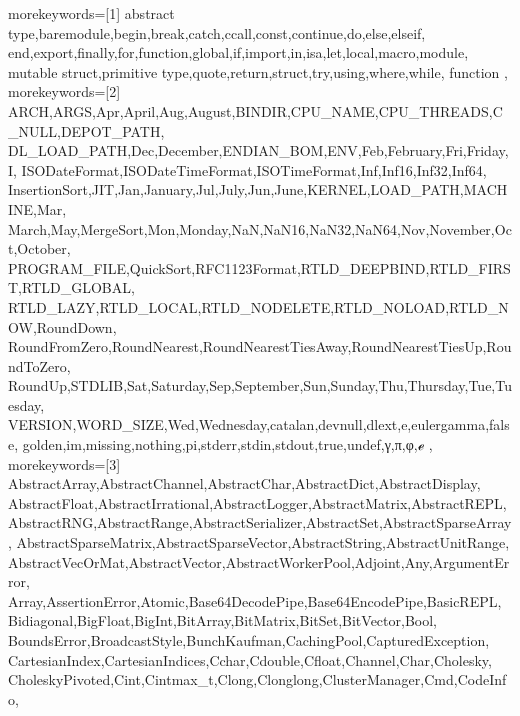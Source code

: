 \usepackage[linewidth=1pt]{mdframed}


\renewcommand{\arraystretch}{1.3}

\newcommand{\cmark}{\textcolor{green!80!black}{\ding{51}}}
\newcommand{\xmark}{\textcolor{red}{\ding{55}}}




{%
%
%
morekeywords=[1]
{%
abstract type,baremodule,begin,break,catch,ccall,const,continue,do,else,elseif,%
end,export,finally,for,function,global,if,import,in,isa,let,local,macro,module,%
mutable struct,primitive type,quote,return,struct,try,using,where,while, function%
},%
%
%
morekeywords=[2]
{%
ARCH,ARGS,Apr,April,Aug,August,BINDIR,CPU_NAME,CPU_THREADS,C_NULL,DEPOT_PATH,%
DL_LOAD_PATH,Dec,December,ENDIAN_BOM,ENV,Feb,February,Fri,Friday,I,%
ISODateFormat,ISODateTimeFormat,ISOTimeFormat,Inf,Inf16,Inf32,Inf64,%
InsertionSort,JIT,Jan,January,Jul,July,Jun,June,KERNEL,LOAD_PATH,MACHINE,Mar,%
March,May,MergeSort,Mon,Monday,NaN,NaN16,NaN32,NaN64,Nov,November,Oct,October,%
PROGRAM_FILE,QuickSort,RFC1123Format,RTLD_DEEPBIND,RTLD_FIRST,RTLD_GLOBAL,%
RTLD_LAZY,RTLD_LOCAL,RTLD_NODELETE,RTLD_NOLOAD,RTLD_NOW,RoundDown,%
RoundFromZero,RoundNearest,RoundNearestTiesAway,RoundNearestTiesUp,RoundToZero,%
RoundUp,STDLIB,Sat,Saturday,Sep,September,Sun,Sunday,Thu,Thursday,Tue,Tuesday,%
VERSION,WORD_SIZE,Wed,Wednesday,catalan,devnull,dlext,e,eulergamma,false,%
golden,im,missing,nothing,pi,stderr,stdin,stdout,true,undef,γ,π,φ,ℯ%
},%
%
%
morekeywords=[3]
{%
AbstractArray,AbstractChannel,AbstractChar,AbstractDict,AbstractDisplay,%
AbstractFloat,AbstractIrrational,AbstractLogger,AbstractMatrix,AbstractREPL,%
AbstractRNG,AbstractRange,AbstractSerializer,AbstractSet,AbstractSparseArray,%
AbstractSparseMatrix,AbstractSparseVector,AbstractString,AbstractUnitRange,%
AbstractVecOrMat,AbstractVector,AbstractWorkerPool,Adjoint,Any,ArgumentError,%
Array,AssertionError,Atomic,Base64DecodePipe,Base64EncodePipe,BasicREPL,%
Bidiagonal,BigFloat,BigInt,BitArray,BitMatrix,BitSet,BitVector,Bool,%
BoundsError,BroadcastStyle,BunchKaufman,CachingPool,CapturedException,%
CartesianIndex,CartesianIndices,Cchar,Cdouble,Cfloat,Channel,Char,Cholesky,%
CholeskyPivoted,Cint,Cintmax_t,Clong,Clonglong,ClusterManager,Cmd,CodeInfo,%
}}
